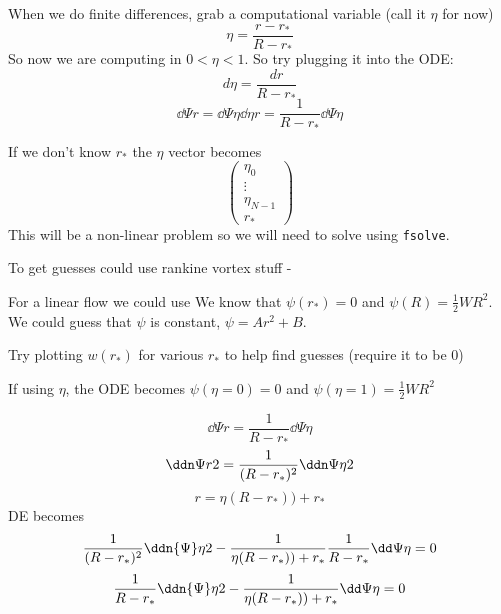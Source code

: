 \documentclass{X:/Documents/Coding/Latex/myreport}
\begin{document}






When we do finite differences, grab a computational variable (call it $\eta$ for now)
\[ \eta = \frac{r - r_*}{R-r_*}\]
So now we are computing in $0<\eta<1$.
So try plugging it into the ODE:
\[d\eta = \frac{dr}{R-r_*}\]
\[\dd\Psi r = \dd\Psi\eta \dd\eta r = \frac{1}{R-r_*} \dd\Psi\eta\]

If we don't know $r_*$ the $\eta$ vector becomes
\[\begin{pmatrix}
    \eta_0\\
    \vdots\\
    \eta_{N-1}\\
    r_*
\end{pmatrix}\]
This will be a non-linear problem so we will need to solve using \verb|fsolve|.

To get guesses could use rankine vortex stuff - 

For a linear flow we could use
We know that $\psi(r_*) = 0$ and $\psi(R) = \frac12 WR^2$. We could guess that $\psi$ is constant, $\psi = Ar^2 + B$.

Try plotting $w(r_*)$ for various $r_*$ to help find guesses (require it to be $0$)



If using $\eta$, the ODE becomes
$\psi(\eta = 0) = 0$ and $\psi(\eta=1) = \frac12 WR^2$

\[\dd \Psi r = \frac{1}{R-r_*} \dd\Psi\eta \]
\[\ddn\Psi r 2 = \frac{1}{(R-r_*)^2}\ddn\Psi\eta 2\]
\[r = \eta(R-r_*)) +r_*\]
DE becomes
\[\frac{1}{(R-r_*)^2}\ddn{\Psi}\eta2  -\frac{1}{\eta(R-r_*)) +r_*} \frac1{R-r_*}\dd\Psi \eta =0\]
\[\frac{1}{R-r_*}\ddn{\Psi}\eta2  -\frac{1}{\eta(R-r_*)) +r_*}\dd\Psi \eta =0\]






\clearpage






\end{document}
